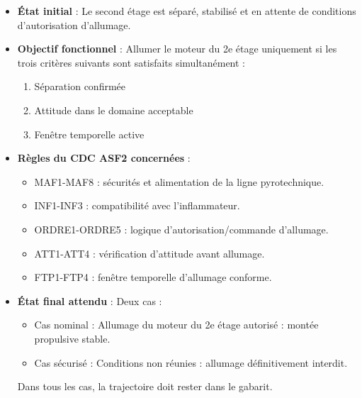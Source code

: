 \begin{itemize}
    \item \textbf{État initial} : Le second étage est séparé, stabilisé et en attente de conditions d’autorisation d’allumage.
    \item \textbf{Objectif fonctionnel} : Allumer le moteur du 2e étage uniquement si les trois critères suivants sont
    satisfaits simultanément :
    \begin{enumerate}
        \item Séparation confirmée
        \item Attitude dans le domaine acceptable
        \item Fenêtre temporelle active
    \end{enumerate}
    \item \textbf{Règles du \acrshort{CDC} ASF2 concernées} :
    \begin{itemize}
        \item MAF1-MAF8\cite[p. ~68-70]{CDC_BiEtage} : sécurités et alimentation de la ligne pyrotechnique.
        \item INF1-INF3\cite[p. ~73-75]{CDC_BiEtage} : compatibilité avec l’inflammateur.
        \item ORDRE1-ORDRE5\cite[p. ~78-80]{CDC_BiEtage} : logique d’autorisation/commande d’allumage.
        \item ATT1-ATT4\cite[p. ~81-83]{CDC_BiEtage} : vérification d’attitude avant allumage.
        \item FTP1-FTP4\cite[p. ~84-86]{CDC_BiEtage} : fenêtre temporelle d’allumage conforme.
    \end{itemize}
    \item \textbf{État final attendu} : Deux cas :
    \begin{itemize}
        \item Cas nominal : Allumage du moteur du 2e étage autorisé : montée propulsive stable.
        \item Cas sécurisé : Conditions non réunies : allumage définitivement interdit.
    \end{itemize}
    Dans tous les cas, la trajectoire doit rester dans le gabarit.
\end{itemize}

\vfill

